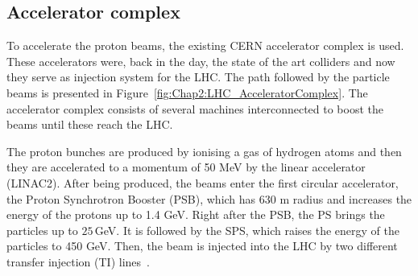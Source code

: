 \begin{comment}
Of course, only stable charge particles\footnote{Long-lived particles such as the muon ($\tau \approx 2\times10^{-6}$ s) are discussed to be 
used on a muon collider~\cite{Long:2020wfp}.} such as electrons, positrons, protons, antiprotons and some ions, can be accelerated by
the magnetic fields described. The force that experiments a charged particle with charge $q$ moving under a magnetic field $B$ at
a speed $v$ is given by Lorentz law
\begin{equation}
	\overrightarrow{F} = q \overrightarrow{v} \times \overrightarrow{B}
\end{equation}
and, since $\overrightarrow{B}$ is perpendicular to $\overrightarrow{v}$, this force is always directed to the centre of the circle of radius $r$:  $F = Bqv = m\frac{v^2}{r}$.
\end{comment}



\subsection{Accelerator complex}
\label{sec:Chap2:LHC:AcceleratorComplex}
To accelerate the proton beams, the existing CERN accelerator complex is used.
These accelerators were, back in the day, the state of the art colliders and now they serve
as injection system for the LHC. The path followed by the particle beams is presented in
 Figure~\ref{fig:Chap2:LHC_AcceleratorComplex}. The accelerator complex consists of
several machines interconnected to boost the beams until these reach the LHC.

The proton bunches are produced by ionising a gas of hydrogen atoms and then they are accelerated to a
momentum of 50 MeV by the linear accelerator (LINAC2). %
After being produced, the beams enter the first circular accelerator, the Proton Synchrotron 
Booster (PSB), which has 630 m radius and increases the energy of the protons up to 1.4 GeV.
Right after the PSB, the PS brings the particles up to $25\,$GeV. 
It is followed by the SPS, which raises the energy of the particles to 450 GeV. %
Then, the beam is injected into the LHC by two different  transfer injection (TI) lines~\cite{Lari:1069714}. %
 
